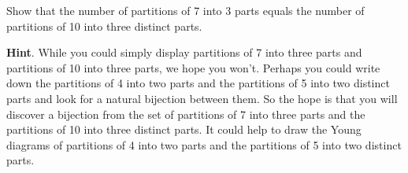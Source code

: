 \documentclass{book}
\begin{document}
\setcounter{cpjt}{311}
\addtocounter{cpjt}{-1}
\begin{activity}\label{activity-304}
\hypertarget{p-1542}{}%
Show that the number of partitions of 7 into 3 parts equals the number of partitions of 10 into three distinct parts.%
\par\smallskip%
\noindent\textbf{Hint}.\hypertarget{hint-199}{}\quad%
\hypertarget{p-1543}{}%
While you could simply display partitions of 7 into three parts and partitions of 10 into three parts, we hope you won't. Perhaps you could write down the partitions of 4 into two parts and the partitions of 5 into two distinct parts and look for a natural bijection between them. So the hope is that you will discover a bijection from the set of partitions of 7 into three parts and the partitions of 10 into three distinct parts. It could help to draw the Young diagrams of partitions of 4 into two parts and the partitions of 5 into two distinct parts.%
\par\smallskip%
\noindent\end{activity}

\clearpage
\end{document}
